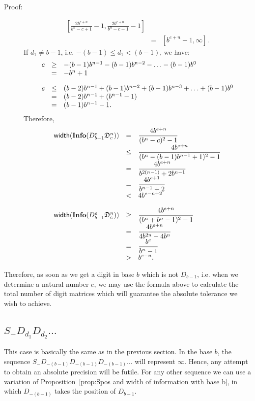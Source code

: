 \documentclass[11pt,a4paper]{article}
\newenvironment{proof}
	{ \begin{description} \item[Proof:] \footnotesize }
	{ \end{description} }
\begin{document}
\begin{proof}
\[\begin{array}{rcl}
				\displaystyle{ \left[ \frac{2b^{e+n}}{b^n-c+1} - 1,
				\frac{2b^{e+n}}{b^n-c-1} -1 \right] } \\
			&=& [b^{e+n}-1, \infty].
		\end{array} \]
		If $d_1 \ne b-1$, i.e. $-(b-1) \le d_1 < (b-1)$, we have:
		\[ \begin{array}{rcl}
			c &\ge& -(b-1) b^{n-1} - (b-1) b^{n-2} - \ldots - (b-1) b^0 \\
			&=& -b^n + 1 \vspace{1em} \\
			c &\le& (b-2) b^{n-1} + (b-1) b^{n-2} + (b-1) b^{n-3} +
				\ldots + (b-1) b^0 \\
			&=& (b-2) b^{n-1} + (b^{n-1}-1) \\
			&=& (b-1) b^{n-1} - 1.
		\end{array} \]
		Therefore,
		\[ \begin{array}{rcl}
			{\sf width} ( {\bf Info} ( D_{b-1}^e \mathfrak{D}_c^n ) ) &=&
				\displaystyle{ \frac{4b^{e+n}}{(b^n-c)^2-1} } \\
			&\le& \displaystyle{ \frac{4b^{e+n}}{(b^n-(b-1)b^{n-1}+1)^2 - 1} } \\
			&=& \displaystyle{ \frac{4b^{e+n}}{b^{2(n-1)}+2b^{n-1}}  } \\
			&=& \displaystyle{ \frac{4b^{e+1}}{b^{n-1}+2}  } \\
			&<& 4b^{e-n+2} \vspace{1em} \\
			{\sf width} ( {\bf Info} ( D_{b-1}^e \mathfrak{D}_c^n ) ) &\ge&
				\displaystyle{ \frac{4b^{e+n}}{(b^n+b^n-1)^2-1}  } \\
			&=& \displaystyle{ \frac{4b^{e+n}}{4b^{2n}-4b^n} } \\
			&=& \displaystyle{ \frac{b^e}{b^n-1}  } \\
			&>& b^{e-n}.
		\end{array} \]
	\end{proof}

Therefore, as soon as we get a digit in base $b$ which is not $D_{b-1}$,
	i.e. when we determine a natural number $e$, we may use the formula
	above to calculate the total number of digit matrices which will
	guarantee the absolute tolerance we wish to achieve.


\subsection{$S_- D_{d_1} D_{d_2} \ldots$} \label{subsection sneg}
This case is basically the same as in the previous section. In the base
	$b$, the sequence $S_- D_{-(b-1)} D_{-(b-1)} D_{-(b-1)} \ldots$ will
	represent $\infty$. Hence, any attempt to obtain an absolute
	precision will be futile. For any other sequence we can use a
	variation of Proposition~\ref{prop:Spos and width of information with
	base b}, in which $D_{-(b-1)}$ takes the position of $D_{b-1}$.
\end{document}

